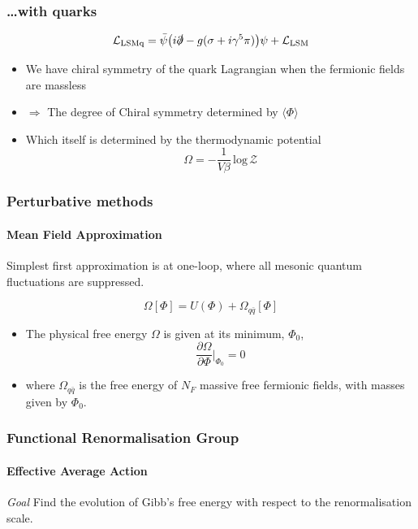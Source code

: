 \documentclass[10pt,a4paper,usenames,dvipsnames]{beamer}
\begin{document}
\begin{frame}
  \frametitle{\dots with quarks}

  \begin{block}{}
    \begin{equation*}
      \mathcal{L}_{\text{LSMq}} = \bar{\psi}\big(i\slashed{\partial} - g(\sigma + i\gamma^5\pi) \big)\psi +
      \mathcal{L}_{\text{LSM}}
    \end{equation*}
  \end{block}

  \begin{itemize}
    \item We have chiral symmetry of the quark Lagrangian when the fermionic fields are massless
    \item $\Rightarrow$ The degree of Chiral symmetry determined by $\langle \Phi \rangle$
    \item Which itself is determined by the thermodynamic potential 
  \[
    \Omega = -\frac{1}{V\beta} \, \text{log}\,\mathcal{Z}
  \]
  \end{itemize}
\end{frame}

\begin{frame}
  \frametitle{Perturbative methods}
  \framesubtitle{Mean Field Approximation}

  Simplest first approximation is at one-loop, where all mesonic quantum fluctuations are suppressed.

  \begin{block}{}
    \begin{equation*}
      \Omega[\Phi] = U(\Phi) + \Omega_{q\bar{q}}[\Phi]
    \end{equation*}
  \end{block}

  \begin{itemize}
    \item The physical free energy $\Omega$ is given at its minimum, $\Phi_0$, 
      \begin{equation*}
        \frac{\partial\Omega}{\partial\Phi} \Big|_{\Phi_0} = 0
      \end{equation*}
    \item where $\Omega_{q\bar{q}}$ is the free energy of $N_F$ massive free fermionic fields, with masses given by $\Phi_0$.
  \end{itemize}

\end{frame}

\begin{frame}
  \frametitle{Functional Renormalisation Group}
  \framesubtitle{Effective Average Action}

  \begin{alertblock}{\itshape Goal}
    Find the evolution of Gibb's free energy with respect to the renormalisation scale.
  \end{alertblock}
\end{frame}
\end{document}
